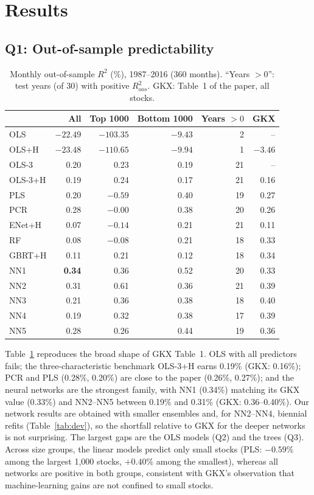 \documentclass[10pt]{article}
\begin{document}
\section{Results}
\subsection{Q1: Out-of-sample predictability}
\begin{table}[t]\centering\small
\caption{Monthly out-of-sample $R^2$ (\%), 1987--2016 (360 months). ``Years $>0$'': test years (of 30) with positive $R^2_{oos}$.
GKX: Table~1 of the paper, all stocks.}\label{tab:r2}
\begin{tabular}{lrrrrr}\toprule
 & All & Top 1000 & Bottom 1000 & Years $>0$ & GKX \\\midrule
OLS      & $-22.49$ & $-103.35$ & $-9.43$ & 2 & -- \\
OLS+H    & $-23.48$ & $-110.65$ & $-9.94$ & 1 & $-3.46$ \\
OLS-3    & 0.20 & 0.23 & 0.19 & 21 & -- \\
OLS-3+H  & 0.19 & 0.24 & 0.17 & 21 & 0.16 \\
PLS      & 0.20 & $-0.59$ & 0.40 & 19 & 0.27 \\
PCR      & 0.28 & $-0.00$ & 0.38 & 20 & 0.26 \\
ENet+H   & 0.07 & $-0.14$ & 0.21 & 21 & 0.11 \\
RF       & 0.08 & $-0.08$ & 0.21 & 18 & 0.33 \\
GBRT+H   & 0.11 & 0.21 & 0.12 & 18 & 0.34 \\
NN1      & \textbf{0.34} & 0.36 & 0.52 & 20 & 0.33 \\
NN2      & 0.31 & 0.61 & 0.36 & 21 & 0.39 \\
NN3      & 0.21 & 0.36 & 0.38 & 18 & 0.40 \\
NN4      & 0.19 & 0.32 & 0.38 & 17 & 0.39 \\
NN5      & 0.28 & 0.26 & 0.44 & 19 & 0.36 \\
\bottomrule\end{tabular}
\end{table}

Table~\ref{tab:r2} reproduces the broad shape of GKX Table~1. OLS with all predictors fails; the three-characteristic
benchmark OLS-3+H earns 0.19\% (GKX: 0.16\%); PCR and PLS (0.28\%, 0.20\%) are close to the paper (0.26\%, 0.27\%); and
the neural networks are the strongest family, with NN1 (0.34\%) matching its GKX value (0.33\%) and NN2--NN5 between 0.19\%
and 0.31\% (GKX: 0.36--0.40\%). Our network results are obtained with smaller ensembles and, for NN2--NN4, biennial refits
(Table~\ref{tab:dev}), so the shortfall relative to GKX for the deeper networks is not surprising. The largest gaps are the
OLS models (Q2) and the trees (Q3). Across size groups, the linear models predict only small stocks (PLS: $-0.59\%$ among
the largest 1,000 stocks, $+0.40\%$ among the smallest), whereas all networks are positive in both groups, consistent with
GKX's observation that machine-learning gains are not confined to small stocks.
\end{document}
